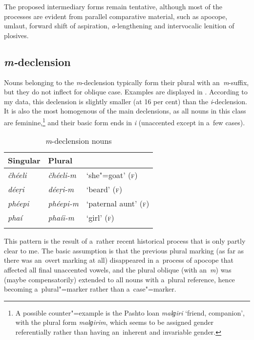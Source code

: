 The proposed intermediary forms remain tentative, although most of the processes are evident from parallel comparative material, such as apocope, umlaut, forward shift of aspiration, \textit{a}-lengthening and intervocalic lenition of plosives.

\subsection{\textit{m-}declension}
\label{subsec:4-6-3}

Nouns belonging to the \textit{m}-declension typically form their plural with an~\textit{m}-suffix, but they do not inflect for oblique case. Examples are displayed in . According to my data, this declension is slightly smaller (at 16 per cent) than the \textit{i}-declension. It is also the most homogenous of the main declensions, as all nouns in this class are feminine,\footnote{A possible counter"=example is the Pashto loan \textit{malɡiri} `friend, companion', with the plural form \textit{malɡirim}, which seems to be assigned gender referentially rather than having an~inherent and invariable gender.} and their basic form ends in \textit{i} (unaccented except in a~few cases).


\begin{table}[ht]
\caption{\textit{m}-declension nouns}
\begin{tabularx}{.75\textwidth}{ Q Q l }
\lsptoprule
Singular &
Plural &
\\\hline
\textit{čhéeli } &
\textit{čhéeli-m} &
`she"=goat' (\textsc{f})\\
\textit{déeṛi} &
\textit{déeṛi-m} &
`beard' (\textsc{f})\\
\textit{phéepi} &
\textit{phéepi-m} &
`paternal aunt' (\textsc{f})\\
\textit{phaí} &
\textit{phaíi-m} &
`girl' (\textsc{f})\\\lspbottomrule
\end{tabularx}
\label{tab:4-16}
\end{table}


This pattern is the result of a~rather recent historical process that is only partly clear to me. The basic assumption is that the previous plural marking (as far as there was an~overt marking at all) disappeared in a~process of apocope that affected all final unaccented vowels, and the plural oblique (with an~\textit{m}) was (maybe compensatorily) extended to all nouns with a~plural reference, hence becoming a~plural"=marker rather than a~case"=marker.



